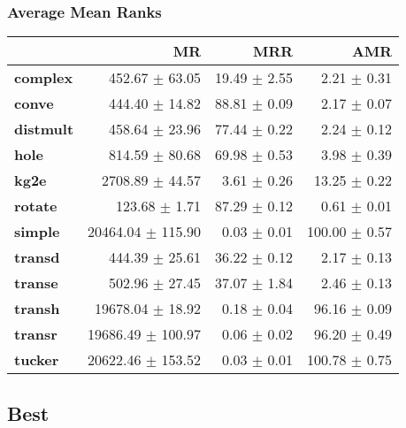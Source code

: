 \documentclass{article}
\begin{document}
    \subsubsection{Average Mean Ranks}
    \begin{center}
    \begin{tabular}{lrrr}
\toprule
{} &                 MR &           MRR &            AMR \\
\midrule
\textbf{complex } &     452.67 $\pm$ 63.05 &  19.49 $\pm$ 2.55 &    2.21 $\pm$ 0.31 \\
\textbf{conve   } &     444.40 $\pm$ 14.82 &  88.81 $\pm$ 0.09 &    2.17 $\pm$ 0.07 \\
\textbf{distmult} &     458.64 $\pm$ 23.96 &  77.44 $\pm$ 0.22 &    2.24 $\pm$ 0.12 \\
\textbf{hole    } &     814.59 $\pm$ 80.68 &  69.98 $\pm$ 0.53 &    3.98 $\pm$ 0.39 \\
\textbf{kg2e    } &    2708.89 $\pm$ 44.57 &   3.61 $\pm$ 0.26 &   13.25 $\pm$ 0.22 \\
\textbf{rotate  } &      123.68 $\pm$ 1.71 &  87.29 $\pm$ 0.12 &    0.61 $\pm$ 0.01 \\
\textbf{simple  } &  20464.04 $\pm$ 115.90 &   0.03 $\pm$ 0.01 &  100.00 $\pm$ 0.57 \\
\textbf{transd  } &     444.39 $\pm$ 25.61 &  36.22 $\pm$ 0.12 &    2.17 $\pm$ 0.13 \\
\textbf{transe  } &     502.96 $\pm$ 27.45 &  37.07 $\pm$ 1.84 &    2.46 $\pm$ 0.13 \\
\textbf{transh  } &   19678.04 $\pm$ 18.92 &   0.18 $\pm$ 0.04 &   96.16 $\pm$ 0.09 \\
\textbf{transr  } &  19686.49 $\pm$ 100.97 &   0.06 $\pm$ 0.02 &   96.20 $\pm$ 0.49 \\
\textbf{tucker  } &  20622.46 $\pm$ 153.52 &   0.03 $\pm$ 0.01 &  100.78 $\pm$ 0.75 \\
\bottomrule
\end{tabular}

    \end{center}
    \subsection{Best}
\end{document}

